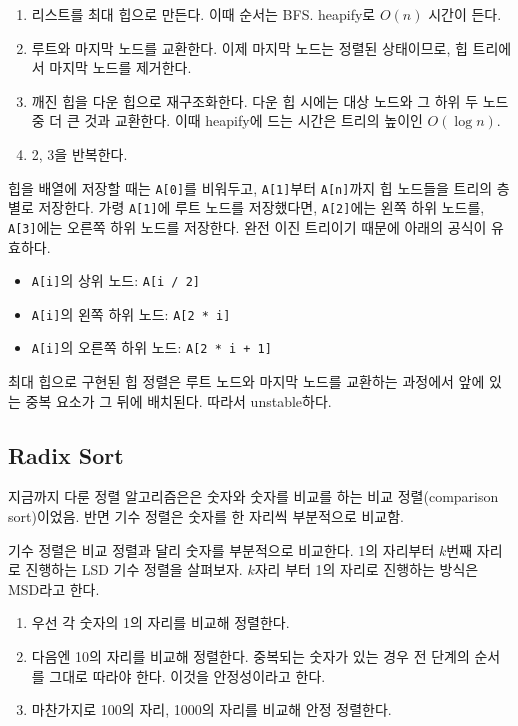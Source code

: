 \begin{enumerate}
  \item 리스트를 최대 힙으로 만든다. 이때 순서는 BFS. heapify로 $O(n)$ 시간이 든다.
  \item 루트와 마지막 노드를 교환한다. 이제 마지막 노드는 정렬된 상태이므로, 힙 트리에서 마지막 노드를 제거한다.
  \item 깨진 힙을 다운 힙으로 재구조화한다. 다운 힙 시에는 대상 노드와 그 하위 두 노드 중 더 큰 것과 교환한다. 이때 heapify에 드는 시간은 트리의 높이인 $O(\log n)$.
  \item 2, 3을 반복한다.
\end{enumerate}

힙을 배열에 저장할 때는 \texttt{A[0]}를 비워두고, \texttt{A[1]}부터 \texttt{A[n]}까지 힙 노드들을 트리의 층별로 저장한다. 가령 \texttt{A[1]}에 루트 노드를 저장했다면, \texttt{A[2]}에는 왼쪽 하위 노드를, \texttt{A[3]}에는 오른쪽 하위 노드를 저장한다. 완전 이진 트리이기 때문에 아래의 공식이 유효하다.

\begin{itemize}
  \item \texttt{A[i]}의 상위 노드: \texttt{A[i / 2]}
  \item \texttt{A[i]}의 왼쪽 하위 노드: \texttt{A[2 * i]}
  \item \texttt{A[i]}의 오른쪽 하위 노드: \texttt{A[2 * i + 1]}
\end{itemize}

최대 힙으로 구현된 힙 정렬은 루트 노드와 마지막 노드를 교환하는 과정에서 앞에 있는 중복 요소가 그 뒤에 배치된다. 따라서 unstable하다.

\subsection{Radix Sort}

지금까지 다룬 정렬 알고리즘은은 숫자와 숫자를 비교를 하는 비교 정렬(comparison sort)이었음. 반면 기수 정렬은 숫자를 한 자리씩 부분적으로 비교함.

기수 정렬은 비교 정렬과 달리 숫자를 부분적으로 비교한다. 1의 자리부터 $k$번째 자리로 진행하는 LSD 기수 정렬을 살펴보자. $k$자리 부터 1의 자리로 진행하는 방식은 MSD라고 한다.

\begin{enumerate}
  \item 우선 각 숫자의 1의 자리를 비교해 정렬한다.
  \item 다음엔 10의 자리를 비교해 정렬한다. 중복되는 숫자가 있는 경우 전 단계의 순서를 그대로 따라야 한다. 이것을 안정성이라고 한다.
  \item 마찬가지로 100의 자리, 1000의 자리를 비교해 안정 정렬한다.
\end{enumerate}

